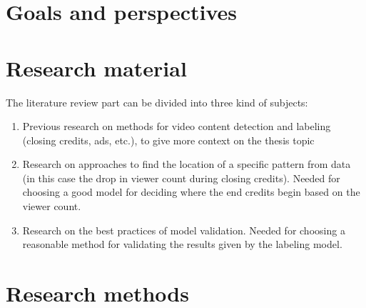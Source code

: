 \documentclass[12pt,a4paper,english,oneside]{article}
\begin{document}
\section{Goals and perspectives}

\section{Research material}

The literature review part can be divided into three kind of subjects:

\begin{enumerate}
    \item Previous research on methods for video content detection and labeling (closing credits, ads, etc.), to give more context on the thesis topic
    \item Research on approaches to find the location of a specific pattern from data (in this case the drop in viewer count during closing credits). Needed for choosing a good model for deciding where the end credits begin based on the viewer count. 
    \item Research on the best practices of model validation. Needed for choosing a reasonable method for validating the results given by the labeling model.
\end{enumerate}

\section{Research methods}
\end{document}
